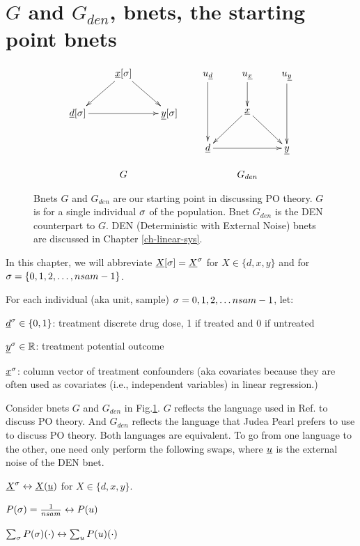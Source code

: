 \section{$G$ and $G_{den}$,
bnets,
the starting point bnets}


\begin{figure}[h!]
$$
\begin{array}{ccc}
\xymatrix{
&\rvx\sqsig\ar[dl]\ar[dr]
\\
\rvd\sqsig\ar[rr]&&\rvy\sqsig
}
&&
\xymatrix{
u_\rvd\ar[dd]&u_\rvx\ar[d]&u_\rvy\ar[dd]
\\
&\rvx\ar[dl]\ar[dr]
\\
\rvd\ar[rr]&&\rvy
}
\\
\\
G&&G_{den}
\end{array}
$$
\caption{Bnets
$G$ and $G_{den}$
are 
our starting
point in discussing PO theory. 
 $G$ is for 
a single individual $\sigma$ of the 
population.
Bnet $G_{den}$ is the 
DEN counterpart 
to $G$.
DEN (Deterministic with
External Noise) bnets are discussed in Chapter
\ref{ch-linear-sys}.} 
\label{fig-po-G-start}
\end{figure}

In this chapter, we will
abbreviate
${\underline{X}}{[\sigma]}={\underline{X}}^\sigma$
for
$X\in \{d, x, y\}$ 
and for $\sigma=\{0,1,2, \ldots, nsam-1\}$.


For each individual (aka unit, sample) 
$\sigma=0, 1, 2, \ldots nsam-1$, let:

${\underline{d}}^\sigma\in\{0,1\}$: treatment discrete drug dose,  1 if treated and 0 if untreated

${\underline{y}}^\sigma\in { \mathbb{R}}$:
 treatment potential outcome

${\underline{x}}^\sigma$: column vector of treatment 
confounders 
(aka covariates because they
are often used as covariates (i.e., 
independent
variables) in linear regression.)

Consider bnets $G$ and $G_{den}$
in 
 Fig.\ref{fig-po-G-start}.
$G$ reflects the language
used in Ref.\cite{book-mixtape}
to discuss PO theory. And
$G_{den}$ reflects
the language that Judea Pearl 
prefers to use to discuss PO theory.
Both languages are equivalent. To go from
one language to the other, one need only
perform the following
swaps, where ${\underline{u}}$
is the external noise of the DEN bnet.

${\underline{X}}^\sigma\leftrightarrow {\underline{X}}({\underline{u}})$
for $X\in \{d, x, y\}$.

$P(\sigma)=\frac{1}{nsam}\leftrightarrow P(u)$

$\sum_\sigma P(\sigma) (\cdot)
\leftrightarrow \sum_uP(u) (\cdot)$




